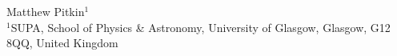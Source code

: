 \iflatexml
Matthew Pitkin$^1$ \\
$^1$SUPA, School of Physics \& Astronomy, University of Glasgow, Glasgow, G12 8QQ, United Kingdom \\
\else
\author{Matthew Pitkin}
\fi
